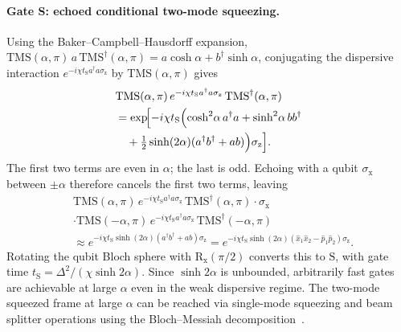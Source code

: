 \documentclass[aps,prx,showpacs,notitlepage,twocolumn,superscriptaddress,nofootinbib,preprintnumbers,floatfix,10pt, longbibliography]{revtex4-2}
\begin{document}
{\paragraph{Gate S: echoed conditional two-mode squeezing.}
Using the Baker--Campbell--Hausdorff expansion,
$\mathrm{TMS}(\alpha,\pi)\,a\,\mathrm{TMS}^\dagger(\alpha,\pi)
= a\cosh\alpha + b^\dagger\sinh\alpha$,
conjugating the dispersive interaction $e^{-i\chi t_\mathrm{S}a^\dagger a\sigma_\mathrm{z}}$
by $\mathrm{TMS}(\alpha,\pi)$ gives
\begin{align}
&\mathrm{TMS}(\alpha,\pi)\,e^{-i\chi t_\mathrm{S}a^\dagger a\sigma_\mathrm{z}}\,
  \mathrm{TMS}^\dagger(\alpha,\pi) \nonumber\\
&= \exp\!\Bigl[-i\chi t_\mathrm{S}\Bigl(
    \cosh^2\!\alpha\,a^\dagger a
   +\sinh^2\!\alpha\,bb^\dagger
   \nonumber\\&\quad+\tfrac{1}{2}\sinh(2\alpha)(a^\dagger b^\dagger+ab)
  \Bigr)\sigma_\mathrm{z}\Bigr].
  \label{eq:TMS-rot}
\end{align}
The first two terms are even in $\alpha$; the last is odd.  Echoing with a
qubit $\sigma_\mathrm{x}$ between $\pm\alpha$ therefore cancels the first
two terms, leaving
\begin{align}
  &\mathrm{TMS}(\alpha,\pi)\,e^{-i\chi t_\mathrm{S}a^\dagger a\sigma_\mathrm{z}}\,
    \mathrm{TMS}^\dagger(\alpha,\pi)\cdot\sigma_\mathrm{x}\nonumber\\
  &\cdot\mathrm{TMS}(-\alpha,\pi)\,e^{-i\chi t_\mathrm{S}a^\dagger a\sigma_\mathrm{z}}\,
    \mathrm{TMS}^\dagger(-\alpha,\pi)\nonumber\\
  &\approx e^{-i\chi t_\mathrm{S}\sinh(2\alpha)(a^\dagger b^\dagger+ab)\sigma_\mathrm{z}}
   = e^{-i\chi t_\mathrm{S}\sinh(2\alpha)(\hat{x}_1\hat{x}_2-\hat{p}_1\hat{p}_2)\sigma_\mathrm{z}}.
  \label{eq:Echoed-TMS}
\end{align}
Rotating the qubit Bloch sphere with $\mathrm{R}_\mathrm{x}(\pi/2)$ converts
this to $\mathrm{S}$, with gate time
$t_\mathrm{S}=\Delta^2/(\chi\sinh 2\alpha)$.  Since $\sinh 2\alpha$ is
unbounded, arbitrarily fast gates are achievable at large $\alpha$ even in
the weak dispersive regime.  The two-mode squeezed frame at large $\alpha$
can be reached via single-mode squeezing and beam splitter operations using
the Bloch--Messiah decomposition~\cite{ISA}.

}
\end{document}
